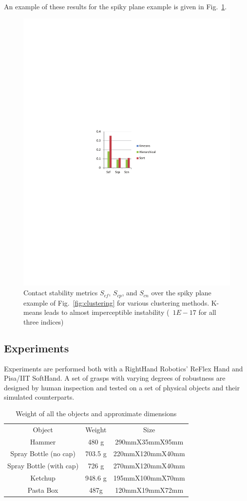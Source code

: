 An example of these results for the spiky plane example is given in Fig.~\ref{fig:SpikyStability}.

\begin{figure}
\centering
\includegraphics[width=0.6\columnwidth]{images/ssoch/spiky_metrics.pdf}
\caption{Contact stability metrics $S_{cf}$, $S_{cp}$, and $S_{cn}$ over the spiky plane example of Fig.~\ref{fig:clustering} for various clustering methods. K-means leads to almost imperceptible instability (~$1E-17$ for all three indices)}
\label{fig:SpikyStability}
\end{figure}


\subsection{Experiments}
\label{experiments5}

Experiments are performed both with a RightHand Robotics' ReFlex Hand and Pisa/IIT SoftHand.  A set of grasps with varying degrees of robustness are designed by human inspection and tested on a set of physical objects and their simulated counterparts.

\begin{table}[hbt]
   \begin{center}
   \begin{tabular}{| c | c | c |}
   \hline
   Object & Weight & Size \\
   \cline{1-3}
   Hammer					& 480 g   	& 290mmX35mmX95mm      \\\hline
   Spray Bottle (no cap)	& 703.5 g   & 220mmX120mmX40mm      \\\hline
   Spray Bottle (with cap)	& 726 g   	& 270mmX120mmX40mm      \\\hline
   Ketchup				& 948.6 g   & 195mmX100mmX70mm   \\\hline
   Pasta Box				& 487g      & 120mmX19mmX72mm      \\\hline
   \end{tabular}
   \end{center}
   \caption{Weight of all the objects and approximate dimensions}
   \label{table:object}
\end{table}


